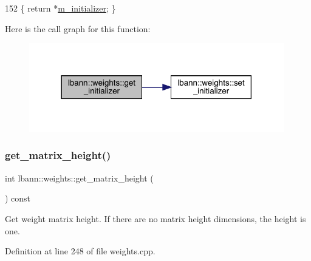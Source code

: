 \begin{DoxyCode}
152 \{ \textcolor{keywordflow}{return} *\hyperlink{classlbann_1_1weights_a3ddbcce8d543e975efeebdb43e82444c}{m\_initializer}; \}
\end{DoxyCode}
Here is the call graph for this function\+:\nopagebreak
\begin{figure}[H]
\begin{center}
\leavevmode
\includegraphics[width=314pt]{classlbann_1_1weights_aeaf4d47037d464922121223d4b0b6c33_cgraph}
\end{center}
\end{figure}
\mbox{\label{classlbann_1_1weights_ad36676b9b43bced1cc7e332e3745411f}} 
\subsubsection{\texorpdfstring{get\+\_\+matrix\+\_\+height()}{get\_matrix\_height()}}
{\footnotesize\ttfamily int lbann\+::weights\+::get\+\_\+matrix\+\_\+height (\begin{DoxyParamCaption}{ }\end{DoxyParamCaption}) const}

Get weight matrix height. If there are no matrix height dimensions, the height is one. 

Definition at line 248 of file weights.\+cpp.


